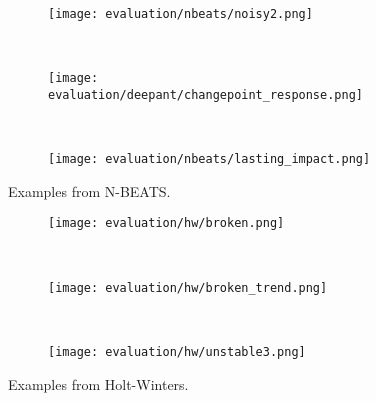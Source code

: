 \begin{figure}[htp!]
    \begin{subfigure}[b]{\linewidth}
        \centering
        \texttt{[image: evaluation/nbeats/noisy2.png]}
        \label{fig:nbeats-cyclicity}
    \end{subfigure}
    \\
    \begin{subfigure}[b]{\linewidth}
        \centering
        \texttt{[image: evaluation/deepant/changepoint\_response.png]}
        \label{fig:nbeats-resembles}
    \end{subfigure}
    \\
    \begin{subfigure}[b]{\linewidth}
        \centering
        \texttt{[image: evaluation/nbeats/lasting\_impact.png]}
        \label{fig:nbeats-spike-impact}
    \end{subfigure}
    \caption{Examples from N-BEATS.}\label{fig:nbeats-output}
\end{figure}

\begin{figure}[htp!]
    \begin{subfigure}[b]{\linewidth}
        \centering
        \texttt{[image: evaluation/hw/broken.png]}
        \label{fig:hw-broken}
    \end{subfigure}
    \\
    \begin{subfigure}[b]{\linewidth}
        \centering
        \texttt{[image: evaluation/hw/broken\_trend.png]}
        \label{fig:hw-trend-instability}
    \end{subfigure}
    \\
    \begin{subfigure}[b]{\linewidth}
        \centering
        \texttt{[image: evaluation/hw/unstable3.png]}
        \label{fig:hw-ordinary}
    \end{subfigure}
    \caption{Examples from Holt-Winters.}\label{fig:hw-output}
\end{figure}

